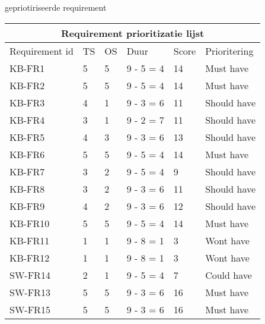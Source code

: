 \begin{graphic}
	\vspace{0.2cm}
	\captionsetup{type=table}
	\caption{gepriotiriseerde requirement}
	\begin{tabular}{ |p{3cm}||p{1cm}|p{1cm}|p{1.5cm}|p{1cm}|p{2.5cm}| }
		\hline
		\multicolumn{6}{|c|}{Requirement prioritizatie lijst}       \\
		\hline
		Requirement id & TS & OS & Duur      & Score & Prioritering \\
		\hline
		KB-FR1         & 5  & 5  & 9 - 5 = 4 & 14    & Must have    \\
		KB-FR2         & 5  & 5  & 9 - 5 = 4 & 14    & Must have    \\
		KB-FR3         & 4  & 1  & 9 - 3 = 6 & 11    & Should have  \\
		KB-FR4         & 3  & 1  & 9 - 2 = 7 & 11    & Should have  \\
		KB-FR5         & 4  & 3  & 9 - 3 = 6 & 13    & Should have  \\
		KB-FR6         & 5  & 5  & 9 - 5 = 4 & 14    & Must have    \\
		KB-FR7         & 3  & 2  & 9 - 5 = 4 & 9     & Should have  \\
		KB-FR8         & 3  & 2  & 9 - 3 = 6 & 11    & Should have  \\
		KB-FR9         & 4  & 2  & 9 - 3 = 6 & 12    & Should have  \\
		KB-FR10        & 5  & 5  & 9 - 5 = 4 & 14    & Must have    \\
		KB-FR11        & 1  & 1  & 9 - 8 = 1 & 3     & Wont have    \\
		KB-FR12        & 1  & 1  & 9 - 8 = 1 & 3     & Wont have    \\
		SW-FR14        & 2  & 1  & 9 - 5 = 4 & 7     & Could have   \\
		SW-FR13        & 5  & 5  & 9 - 3 = 6 & 16    & Must have    \\
		SW-FR15        & 5  & 5  & 9 - 3 = 6 & 16    & Must have    \\
		\hline
	\end{tabular}	\label{tab:RequirementPrioritization}
	\vspace{0.2cm}
\end{graphic}

